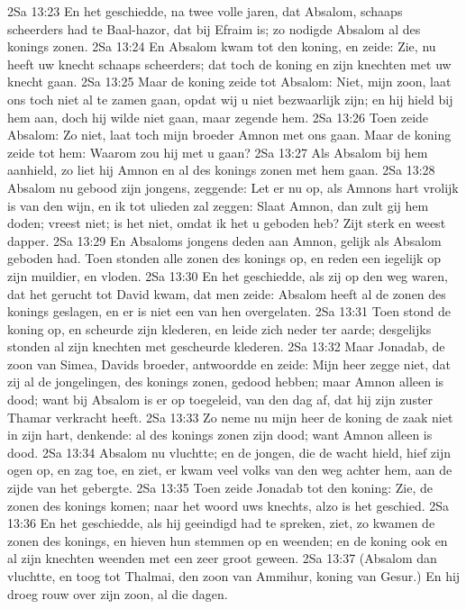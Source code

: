 2Sa 13:23  En het geschiedde, na twee volle jaren, dat Absalom, schaaps scheerders had te Baal-hazor, dat bij Efraim is; zo nodigde Absalom al des konings zonen.
2Sa 13:24  En Absalom kwam tot den koning, en zeide: Zie, nu heeft uw knecht schaaps scheerders; dat toch de koning en zijn knechten met uw knecht gaan.
2Sa 13:25  Maar de koning zeide tot Absalom: Niet, mijn zoon, laat ons toch niet al te zamen gaan, opdat wij u niet bezwaarlijk zijn; en hij hield bij hem aan, doch hij wilde niet gaan, maar zegende hem.
2Sa 13:26  Toen zeide Absalom: Zo niet, laat toch mijn broeder Amnon met ons gaan. Maar de koning zeide tot hem: Waarom zou hij met u gaan?
2Sa 13:27  Als Absalom bij hem aanhield, zo liet hij Amnon en al des konings zonen met hem gaan.
2Sa 13:28  Absalom nu gebood zijn jongens, zeggende: Let er nu op, als Amnons hart vrolijk is van den wijn, en ik tot ulieden zal zeggen: Slaat Amnon, dan zult gij hem doden; vreest niet; is het niet, omdat ik het u geboden heb? Zijt sterk en weest dapper.
2Sa 13:29  En Absaloms jongens deden aan Amnon, gelijk als Absalom geboden had. Toen stonden alle zonen des konings op, en reden een iegelijk op zijn muildier, en vloden.
2Sa 13:30  En het geschiedde, als zij op den weg waren, dat het gerucht tot David kwam, dat men zeide: Absalom heeft al de zonen des konings geslagen, en er is niet een van hen overgelaten.
2Sa 13:31  Toen stond de koning op, en scheurde zijn klederen, en leide zich neder ter aarde; desgelijks stonden al zijn knechten met gescheurde klederen.
2Sa 13:32  Maar Jonadab, de zoon van Simea, Davids broeder, antwoordde en zeide: Mijn heer zegge niet, dat zij al de jongelingen, des konings zonen, gedood hebben; maar Amnon alleen is dood; want bij Absalom is er op toegeleid, van den dag af, dat hij zijn zuster Thamar verkracht heeft.
2Sa 13:33  Zo neme nu mijn heer de koning de zaak niet in zijn hart, denkende: al des konings zonen zijn dood; want Amnon alleen is dood.
2Sa 13:34  Absalom nu vluchtte; en de jongen, die de wacht hield, hief zijn ogen op, en zag toe, en ziet, er kwam veel volks van den weg achter hem, aan de zijde van het gebergte.
2Sa 13:35  Toen zeide Jonadab tot den koning: Zie, de zonen des konings komen; naar het woord uws knechts, alzo is het geschied.
2Sa 13:36  En het geschiedde, als hij geeindigd had te spreken, ziet, zo kwamen de zonen des konings, en hieven hun stemmen op en weenden; en de koning ook en al zijn knechten weenden met een zeer groot geween.
2Sa 13:37  (Absalom dan vluchtte, en toog tot Thalmai, den zoon van Ammihur, koning van Gesur.) En hij droeg rouw over zijn zoon, al die dagen.
